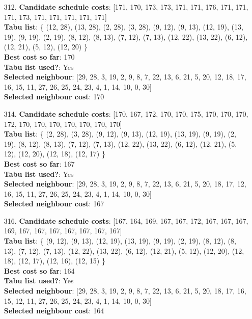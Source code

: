 \documentclass[fleqn]{article}
\begin{document}
\begin{itemize}
    \item[312.] \textbf{Candidate schedule costs}: [171, 170, 173, 173, 171, 171, 176, 171, 171, 171, 173, 171, 171, 171, 171, 171] \\
    \textbf{Tabu list}: \{ (12, 28), (13, 28), (2, 28), (3, 28), (9, 12), (9, 13), (12, 19), (13, 19), (9, 19), (2, 19), (8, 12), (8, 13), (7, 12), (7, 13), (12, 22), (13, 22), (6, 12), (12, 21), (5, 12), (12, 20) \} \\
    \textbf{Best cost so far}: 170 \\
    \textbf{Tabu list used?}: Yes \\
    \textbf{Selected neighbour}: [29, 28, 3, 19, 2, 9, 8, 7, 22, 13, 6, 21, 5, 20, 12, 18, 17, 16, 15, 11, 27, 26, 25, 24, 23, 4, 1, 14, 10, 0, 30] \\
    \textbf{Selected neighbour cost}: 170
      

    \item[314.] \textbf{Candidate schedule costs}: [170, 167, 172, 170, 170, 175, 170, 170, 170, 172, 170, 170, 170, 170, 170, 170, 170] \\
    \textbf{Tabu list}: \{ (2, 28), (3, 28), (9, 12), (9, 13), (12, 19), (13, 19), (9, 19), (2, 19), (8, 12), (8, 13), (7, 12), (7, 13), (12, 22), (13, 22), (6, 12), (12, 21), (5, 12), (12, 20), (12, 18), (12, 17) \} \\
    \textbf{Best cost so far}: 167 \\
    \textbf{Tabu list used?}: Yes \\
    \textbf{Selected neighbour}: [29, 28, 3, 19, 2, 9, 8, 7, 22, 13, 6, 21, 5, 20, 18, 17, 12, 16, 15, 11, 27, 26, 25, 24, 23, 4, 1, 14, 10, 0, 30] \\
    \textbf{Selected neighbour cost}: 167
      

    \item[316.] \textbf{Candidate schedule costs}: [167, 164, 169, 167, 167, 172, 167, 167, 167, 169, 167, 167, 167, 167, 167, 167, 167] \\
    \textbf{Tabu list}: \{ (9, 12), (9, 13), (12, 19), (13, 19), (9, 19), (2, 19), (8, 12), (8, 13), (7, 12), (7, 13), (12, 22), (13, 22), (6, 12), (12, 21), (5, 12), (12, 20), (12, 18), (12, 17), (12, 16), (12, 15) \} \\
    \textbf{Best cost so far}: 164 \\
    \textbf{Tabu list used?}: Yes \\
    \textbf{Selected neighbour}: [29, 28, 3, 19, 2, 9, 8, 7, 22, 13, 6, 21, 5, 20, 18, 17, 16, 15, 12, 11, 27, 26, 25, 24, 23, 4, 1, 14, 10, 0, 30] \\
    \textbf{Selected neighbour cost}: 164
      


\end{itemize}
\end{document}
